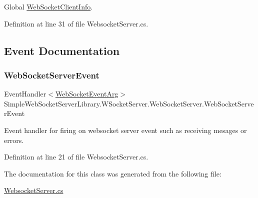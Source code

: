 Global \mbox{\hyperlink{class_simple_web_socket_server_library_1_1_web_socket_client_info}{Web\+Socket\+Client\+Info}}. 



Definition at line 31 of file Websocket\+Server.\+cs.



\subsection{Event Documentation}
\mbox{\label{class_simple_web_socket_server_library_1_1_w_socket_server_1_1_web_socket_server_a6fbda1ede55611bd2e293f27998b21c3}} 
\subsubsection{\texorpdfstring{Web\+Socket\+Server\+Event}{WebSocketServerEvent}}
{\footnotesize\ttfamily Event\+Handler$<$\mbox{\hyperlink{class_simple_web_socket_server_library_1_1_web_socket_event_arg}{Web\+Socket\+Event\+Arg}}$>$ Simple\+Web\+Socket\+Server\+Library.\+W\+Socket\+Server.\+Web\+Socket\+Server.\+Web\+Socket\+Server\+Event}



Event handler for firing on websocket server event such as receiving mesages or errors. 



Definition at line 21 of file Websocket\+Server.\+cs.



The documentation for this class was generated from the following file\+:\begin{DoxyCompactItemize}
\item 
\mbox{\hyperlink{_websocket_server_8cs}{Websocket\+Server.\+cs}}\end{DoxyCompactItemize}
